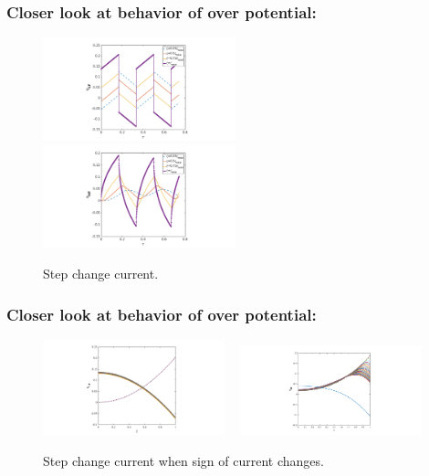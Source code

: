 \documentclass[10pt,xcolor=dvipsnames,compress]{beamer}
\begin{document}
\begin{frame}
\frametitle{Closer look at behavior of over potential:}
\vfill


\begin{figure}[h]
    \centering
    \includegraphics[trim = 4.3in 0.2in 4.3in 0.2in, clip, width=0.5\textwidth]{figs/etaLF_time.png} 
    ~
    \includegraphics[trim = 4.3in 0.2in 4.3in 0.2in, clip, width=0.5\textwidth]{figs/etaHF_time.png}
        \vspace{-3mm}
\caption{Step change current.} 
\end{figure}


\vfill
\end{frame}


\begin{frame}
\frametitle{Closer look at behavior of over potential:}
\vfill


\begin{figure}[h]
    \centering
    \includegraphics[trim = 9.6in 0.2in 9.6in 0.2in, clip, width=0.47\textwidth]{figs/eta_LF.png} 
    ~
    \includegraphics[trim = 7in 0.2in 7in 0.2in, clip, width=0.47\textwidth]{figs/eta_HF.png}
        \vspace{-3mm}
\caption{Step change current when sign of current changes.} 
\end{figure}


\vfill
\end{frame}
\end{document}
